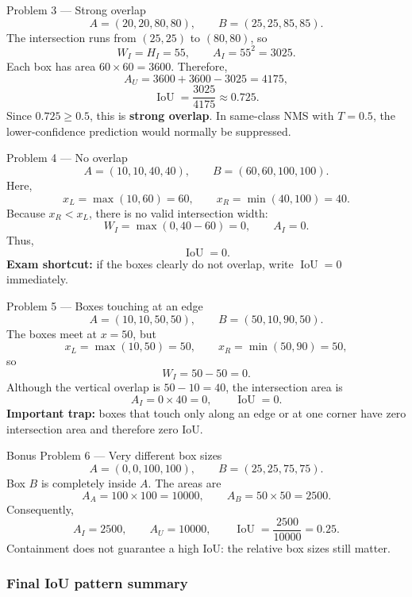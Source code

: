 \documentclass[11pt]{article}
\begin{document}
\begin{practicebox}{Problem 3 --- Strong overlap}
\[
A=(20,20,80,80),
\qquad
B=(25,25,85,85).
\]
The intersection runs from \((25,25)\) to \((80,80)\), so
\[
W_I=H_I=55,
\qquad
\boxed{A_I=55^2=3025}.
\]
Each box has area \(60\times60=3600\). Therefore,
\[
A_U=3600+3600-3025=4175,
\]
\[
\boxed{\operatorname{IoU}=\frac{3025}{4175}\approx0.725}.
\]
Since \(0.725\geq0.5\), this is \textbf{strong overlap}. In same-class NMS with \(T=0.5\), the lower-confidence prediction would normally be suppressed.
\end{practicebox}

\begin{practicebox}{Problem 4 --- No overlap}
\[
A=(10,10,40,40),
\qquad
B=(60,60,100,100).
\]
Here,
\[
x_L=\max(10,60)=60,
\qquad
x_R=\min(40,100)=40.
\]
Because \(x_R<x_L\), there is no valid intersection width:
\[
W_I=\max(0,40-60)=0,
\qquad
A_I=0.
\]
Thus,
\[
\boxed{\operatorname{IoU}=0}.
\]
\textbf{Exam shortcut:} if the boxes clearly do not overlap, write \(\operatorname{IoU}=0\) immediately.
\end{practicebox}

\begin{practicebox}{Problem 5 --- Boxes touching at an edge}
\[
A=(10,10,50,50),
\qquad
B=(50,10,90,50).
\]
The boxes meet at \(x=50\), but
\[
x_L=\max(10,50)=50,
\qquad
x_R=\min(50,90)=50,
\]
so
\[
W_I=50-50=0.
\]
Although the vertical overlap is \(50-10=40\), the intersection area is
\[
A_I=0\times40=0,
\qquad
\boxed{\operatorname{IoU}=0}.
\]
\textbf{Important trap:} boxes that touch only along an edge or at one corner have zero intersection area and therefore zero IoU.
\end{practicebox}

\begin{practicebox}{Bonus Problem 6 --- Very different box sizes}
\[
A=(0,0,100,100),
\qquad
B=(25,25,75,75).
\]
Box \(B\) is completely inside \(A\). The areas are
\[
A_A=100\times100=10000,
\qquad
A_B=50\times50=2500.
\]
Consequently,
\[
A_I=2500,
\qquad
A_U=10000,
\qquad
\boxed{\operatorname{IoU}=\frac{2500}{10000}=0.25}.
\]
Containment does not guarantee a high IoU: the relative box sizes still matter.
\end{practicebox}

\subsubsection{Final IoU pattern summary}
\end{document}
